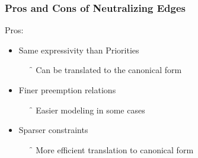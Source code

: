 
\begin{frame}[c]
  \frametitle{Pros and Cons of Neutralizing Edges}

Pros:
\begin{itemize}
  \item Same expressivity than Priorities
    \begin{itemize}
      \item[\f] Can be translated to the canonical form
    \end{itemize}
  \item Finer preemption relations
    \begin{itemize}
      \item[\f] Easier modeling in some cases
    \end{itemize}
  \item Sparser constraints
    \begin{itemize}
      \item[\f] More efficient translation to canonical form
    \end{itemize}
\end{itemize}

\end{frame}
